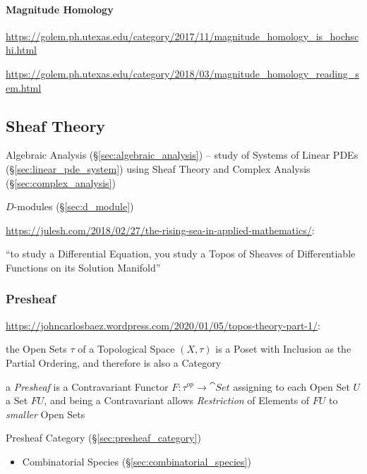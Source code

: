 \paragraph{Magnitude Homology}\label{sec:magnitude_homology}\hfill

\url{https://golem.ph.utexas.edu/category/2017/11/magnitude_homology_is_hochschi.html}

\url{https://golem.ph.utexas.edu/category/2018/03/magnitude_homology_reading_sem.html}



\subsection{Sheaf Theory}\label{sec:sheaf_theory}

\fist Algebraic Analysis (\S\ref{sec:algebraic_analysis}) -- study of Systems of
Linear PDEs (\S\ref{sec:linear_pde_system}) using Sheaf Theory and Complex
Analysis (\S\ref{sec:complex_analysis})

\fist $D$-modules (\S\ref{sec:d_module})

\url{https://julesh.com/2018/02/27/the-rising-sea-in-applied-mathematics/}:

``to study a Differential Equation, you study a Topos of Sheaves of
Differentiable Functions on its Solution Manifold''



\subsubsection{Presheaf}\label{sec:presheaf}

\url{https://johncarlosbaez.wordpress.com/2020/01/05/topos-theory-part-1/}:

the Open Sets $\tau$ of a Topological Space $(X, \tau)$ is a Poset with
Inclusion as the Partial Ordering, and therefore is also a Category

a \emph{Presheaf} is a Contravariant Functor $F : \tau^{op} \rightarrow
\cat{Set}$ assigning to each Open Set $U$ a Set $F U$, and being a Contravariant
allows \emph{Restriction} of Elements of $F U$ to \emph{smaller} Open Sets

Presheaf Category (\S\ref{sec:presheaf_category})

\begin{itemize}
  \item Combinatorial Species (\S\ref{sec:combinatorial_species})
\end{itemize}



